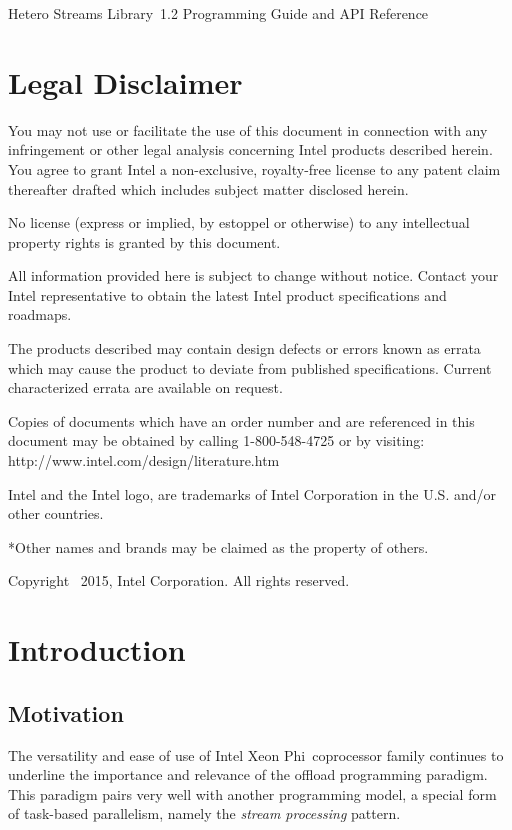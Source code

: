 \documentclass[a4,oneside]{book}
\newcommand{\ixp}{Intel\textregistered{} Xeon Phi\texttrademark{}}
\newcommand{\heterostreams}{Hetero Streams Library}
\begin{document}
\hypersetup{pageanchor=false}
\begin{titlepage}
\vspace*{7cm}
\begin{center}
    {\Large \heterostreams\ 1.2 Programming Guide and API Reference}\\[2em]
\end{center}
\end{titlepage}
\clearemptydoublepage
\chapter*{Legal Disclaimer}
You may not use or facilitate the use of this document in connection with any infringement or other legal analysis concerning Intel products described herein. You agree to grant Intel a non-exclusive, royalty-free license to any patent claim thereafter drafted which includes subject matter disclosed herein.

No license (express or implied, by estoppel or otherwise) to any intellectual property rights is granted by this document.

All information provided here is subject to change without notice. Contact your Intel representative to obtain the latest Intel product specifications and roadmaps.

The products described may contain design defects or errors known as errata which may cause the product to deviate from published specifications. Current characterized errata are available on request.

Copies of documents which have an order number and are referenced in this document may be obtained by calling 1-800-548-4725 or by visiting: http://www.intel.com/design/literature.htm

Intel and the Intel logo, are trademarks of Intel Corporation in the U.S. and/or other countries.

*Other names and brands may be claimed as the property of others.

Copyright \textcopyright\ 2015, Intel Corporation. All rights reserved.
\clearemptydoublepage

\tableofcontents
\clearemptydoublepage
{}
\hypersetup{pageanchor=true}

\chapter{Introduction}
\section{Motivation}
The versatility and ease of use of \ixp\ coprocessor family continues to underline the importance and relevance of the offload programming paradigm.
This paradigm pairs very well with another programming model, a special form of task-based parallelism, namely the \emph{stream processing} pattern.
\end{document}
